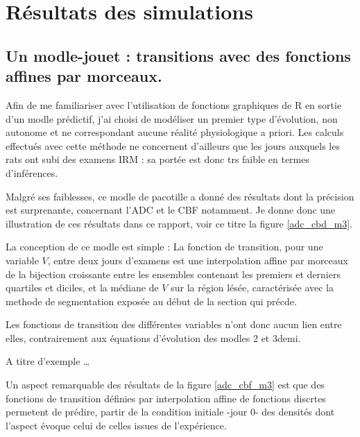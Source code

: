 \section{R\'esultats des simulations}

\subsection{Un modle-jouet : transitions avec des fonctions affines par morceaux.}

Afin de me familiariser avec l'utilisation de fonctions graphiques de R en sortie d'un modle pr\'edictif, %
j'ai choisi de mod\'eliser un premier type d'\'evolution, non autonome et ne correspondant  aucune r\'ealit\'e physiologique a priori. %
Les calculs effectu\'es avec cette m\'ethode ne concernent d'ailleurs que les jours auxquels les rats ont subi des examens IRM : %
sa port\'ee est donc trs faible en termes d'inf\'erences.

\par
Malgr\'e ses faiblesses, ce modle de pacotille a donn\'e des r\'esultats dont la pr\'ecision est surprenante, concernant l'ADC et le CBF notamment. %
Je donne donc une illustration de ces r\'esultats dans ce rapport, voir  ce titre la figure \ref{adc_cbd_m3}.

\par
La conception de ce modle est simple : La fonction de transition, pour une variable $V$, entre deux jours d'examens est %
une interpolation affine par morceaux de la bijection croissante entre les ensembles contenant les premiers et derniers quartiles et diciles, %
et la m\'ediane de $V$ sur la r\'egion l\'es\'ee, caract\'eris\'ee avec la methode de segmentation expos\'ee au d\'ebut de la section qui pr\'ecde.

\par
Les fonctions de transition des diff\'erentes variables n'ont donc aucun lien entre elles, contrairement aux \'equations d'\'evolution des modles 2 et 3demi.

\par
A titre d'exemple \dots %

\ligneinter
Un aspect remarquable des r\'esultats de la figure \ref{adc_cbf_m3} est que %
des fonctions de transition d\'efinies par interpolation affine de fonctions discrtes %
permetent de pr\'edire,  partir de la condition initiale -jour 0- des densit\'es dont l'aspect \'evoque celui de celles issues de l'exp\'erience.


